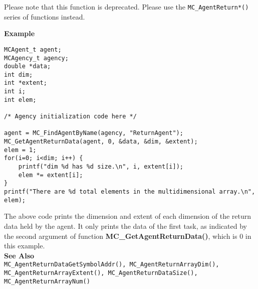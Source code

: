 Please note that this function is deprecated. Please use the 
\texttt{MC\_AgentReturn*()} series of functions instead.

\noindent
{\bf Example}\\
\begin{verbatim}
MCAgent_t agent;
MCAgency_t agency;
double *data;
int dim;
int *extent;
int i;
int elem;

/* Agency initialization code here */

agent = MC_FindAgentByName(agency, "ReturnAgent");
MC_GetAgentReturnData(agent, 0, &data, &dim, &extent);
elem = 1;
for(i=0; i<dim; i++) {
    printf("dim %d has %d size.\n", i, extent[i]);
    elem *= extent[i];
}
printf("There are %d total elements in the multidimensional array.\n", elem);
\end{verbatim}
\noindent
The above code prints the dimension and extent of each dimension of the 
return data held by the agent. 
It only prints the data of the first task, as indicated by the second 
argument of function {\bf MC\_GetAgentReturnData()}, which is 0 in this 
example.\\


\noindent
{\bf See Also}\\
\texttt{MC\_AgentReturnDataGetSymbolAddr(), MC\_AgentReturnArrayDim(),
MC\_AgentReturnArrayExtent(), MC\_AgentReturnDataSize(),
MC\_AgentReturnArrayNum()}

